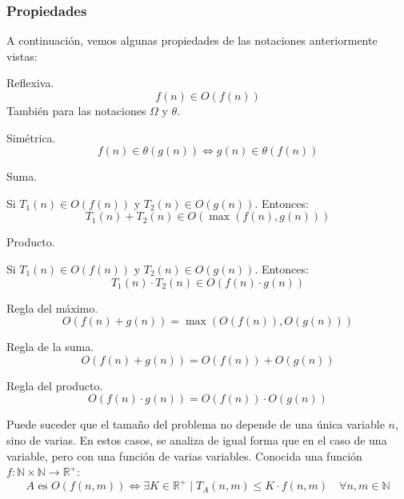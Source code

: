 \subsubsection{Propiedades}
A continuación, vemos algunas propiedades de las notaciones anteriormente vistas:
\begin{description}
    \item Reflexiva.
\begin{equation*}
f(n) \in O(f(n))
\end{equation*}
También para las notaciones $\Omega$ y $\theta$.

\item Simétrica.
\begin{equation*}
f(n) \in \theta(g(n)) \Leftrightarrow g(n) \in \theta(f(n))
\end{equation*}

\item Suma.

Si $T_1(n) \in O(f(n))$ y $T_2(n) \in O(g(n))$. Entonces:
\begin{equation*}
T_1(n) + T_2(n) \in O(\max(f(n), g(n)))
\end{equation*}

\item Producto.

Si $T_1(n) \in O(f(n))$ y $T_2(n) \in O(g(n))$. Entonces:
\begin{equation*}
T_1(n) \cdot T_2(n) \in O(f(n) \cdot g(n))
\end{equation*}

\item Regla del máximo.
\begin{equation*}
O(f(n)+g(n)) = \max(O(f(n)), O(g(n)))
\end{equation*}

\item Regla de la suma.
\begin{equation*}
O(f(n)+g(n)) = O(f(n))+O(g(n))
\end{equation*}

\item Regla del producto.
\begin{equation*}
O(f(n)\cdot g(n)) = O(f(n))\cdot O(g(n))
\end{equation*}

\end{description}

Puede suceder que el tamaño del problema no depende de una única variable $n$, sino de varias.
En estos casos, se analiza de igual forma que en el caso de una variable, pero con una función de varias variables. Conocida una función $f:\mathbb{N}\times\mathbb{N}\rightarrow \mathbb{R}^{+}$:
\begin{equation*}
A \text{\ es\ } O(f(n,m)) \Leftrightarrow \exists K \in \mathbb{R}^{+} \mid T_A(n,m) \leq K \cdot f(n,m)\quad \forall n,m\in \mathbb{N}
\end{equation*}

